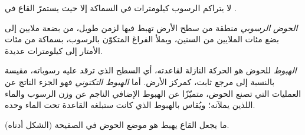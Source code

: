 لا يتراكم الرسوب كيلومترات في السماكة إلا حيث يستمرّ القاع في .

\begin{definition}\label{def:b1:diagenesis-basins:basin}
\emph{الحوض الرسوبي} منطقة من سطح الأرض تهبط فيها  لزمن طويل، من بضعة ملايين إلى بضع مئات الملايين من السنين، ويملأ الفراغ المتكوّن بالرسوب، بسماكة من مئات الأمتار إلى كيلومترات عديدة.
\end{definition}

\begin{definition}\label{def:b1:diagenesis-basins:subsidence}
\emph{الهبوط} للحوض هو الحركة النازلة لقاعدته، أي السطح الذي ترقد عليه رسوباته، مقيسة بالنسبة إلى مرجع ثابت، كمركز الأرض. أما \emph{الهبوط التكتوني} فهو الجزء الناتج عن العمليات التي تصنع الحوض، متميّزًا عن الهبوط الإضافي الناجم عن وزن الرسوب والماء اللذين يملآنه؛ ويُقاس بالهبوط الذي كانت ستبلغه القاعدة تحت الماء وحده.
\end{definition}

ما يجعل القاع يهبط هو موضع الحوض في الصفيحة (الشكل أدناه).

